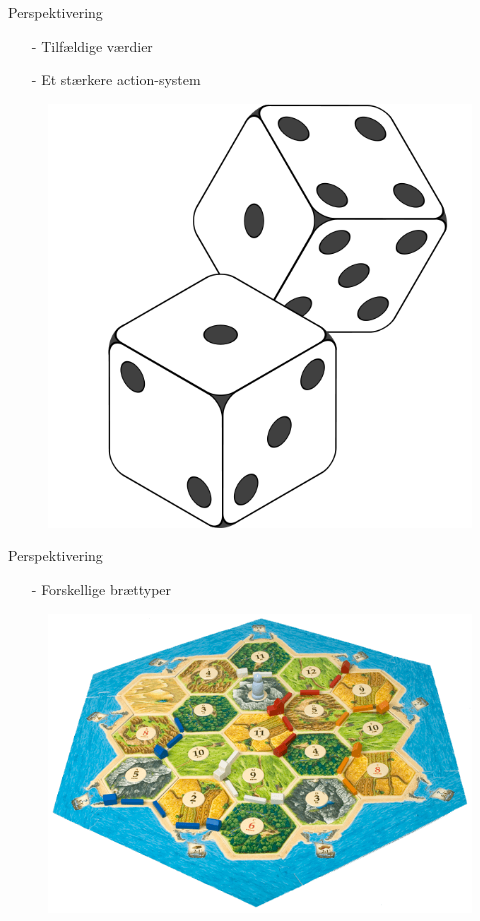 \begin{frame}{Perspektivering}
  \vspace{0.5cm}
  \begin{itemize}
		\item[-] Tilfældige værdier
		\vspace{0.1cm}
		\item[-] Et stærkere action-system
	\end{itemize}
	\begin{figure}[H]
   			\includegraphics[scale=0.15]{billeder/2-Dice-Icon.png}
	\end{figure}	
\end{frame}

\begin{frame}{Perspektivering}
	\vspace{0.4cm}
	\begin{itemize}
		\item[-] Forskellige brættyper
	\end{itemize}
	\begin{figure}[H]
   		\includegraphics[scale=0.3]{billeder/settlers-board2.png}
	\end{figure}	
\end{frame}
